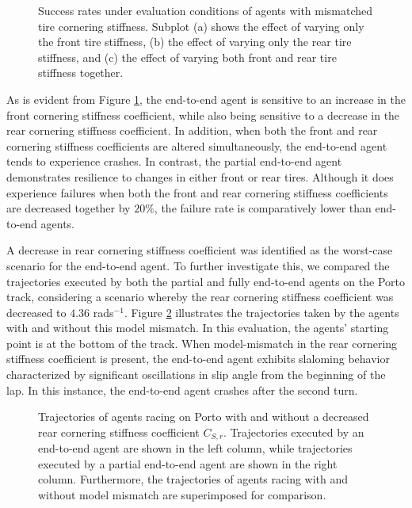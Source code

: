 \begin{figure}[htb!]
    \centering
    
    \caption[Success rate of agents under evaluation conditions with mismatched tire cornering stiffness]{Success rates under evaluation conditions of agents with mismatched tire cornering stiffness. Subplot (a) shows the effect of varying only the front tire stiffness, (b) the effect of varying only the rear tire stiffness, and (c) the effect of varying both front and rear tire stiffness together.}
    \label{fig:c_s}
\end{figure}

As is evident from Figure \ref{fig:c_s}, the end-to-end agent is sensitive to an increase in the front cornering stiffness coefficient, while also being sensitive to a decrease in the rear cornering stiffness coefficient.
In addition, when both the front and rear cornering stiffness coefficients are altered simultaneously, the end-to-end agent tends to experience crashes. 
In contrast, the partial end-to-end agent demonstrates resilience to changes in either front or rear tires.
Although it does experience failures when both the front and rear cornering stiffness coefficients are decreased together by $20\%$, the failure rate is comparatively lower than end-to-end agents.


A decrease in rear cornering stiffness coefficient was identified as the worst-case scenario for the end-to-end agent.
To further investigate this, we compared the trajectories executed by both the partial and fully end-to-end agents on the Porto track, considering a scenario whereby the rear cornering stiffness coefficient was decreased to $4.36$ rads$^{-1}$. 
Figure \ref{fig:c_sr} illustrates the trajectories taken by the agents with and without this model mismatch. 
In this evaluation, the agents' starting point is at the bottom of the track. 
When model-mismatch in the rear cornering stiffness coefficient is present, the end-to-end agent exhibits slaloming behavior characterized by significant oscillations in slip angle from the beginning of the lap.
In this instance, the end-to-end agent crashes after the second turn. 


\begin{figure}[htb!]
    \centering
    
    \caption[Trajectories of agents racing with and without a decreased rear cornering stiffness coefficient]{Trajectories of agents racing on Porto with and without a decreased rear cornering stiffness coefficient $C_{S,r}$. Trajectories executed by an end-to-end agent are shown in the left column, while trajectories executed by a partial end-to-end agent are shown in the right column. Furthermore, the trajectories of agents racing with and without model mismatch are superimposed for comparison.}
    \label{fig:c_sr}
\end{figure}


